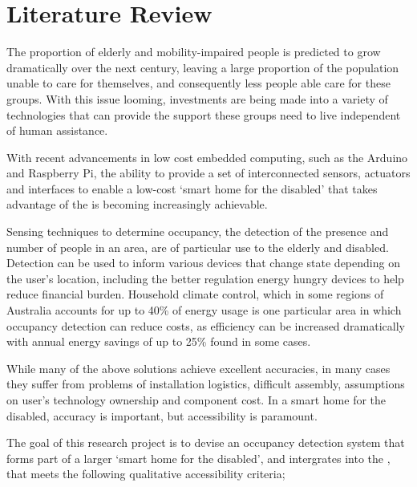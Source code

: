 \documentclass[../thesis/thesis.tex]{subfiles}
\begin{document}
\chapter{Literature Review}
\label{chap:litreview}

The proportion of elderly and mobility-impaired people is predicted to grow dramatically over the next century, leaving a large proportion of the population unable to care for themselves, and consequently less people able care for these groups. \cite{chan2009smart} With this issue looming, investments are being made into a variety of technologies that can provide the support these groups need to live independent of human assistance. 

With recent advancements in low cost embedded computing, such as the Arduino and Raspberry Pi, the ability to provide a set of interconnected sensors, actuators and interfaces to enable a low-cost `smart home for the disabled' that takes advantage of the \iot is becoming increasingly achievable.

Sensing techniques to determine occupancy, the detection of the presence and number of people in an area, are of particular use to the elderly and disabled. Detection can be used to inform various devices that change state depending on the user's location, including the better regulation energy hungry devices to help reduce financial burden. Household climate control, which in some regions of Australia accounts for up to 40\% of energy usage \cite{abs4602} is one particular area in which occupancy detection can reduce costs, as efficiency can be increased dramatically with annual energy savings of up to 25\% found in some cases. \cite{beltran2013thermosense}
 
While many of the above solutions achieve excellent accuracies, in many cases they suffer from problems of installation logistics, difficult assembly, assumptions on user's technology ownership and component cost. In a smart home for the disabled, accuracy is important, but accessibility is paramount.

The goal of this research project is to devise an occupancy detection system that forms part of a larger `smart home for the disabled', and intergrates into the \iot, that meets the following qualitative accessibility criteria;
\end{document}
